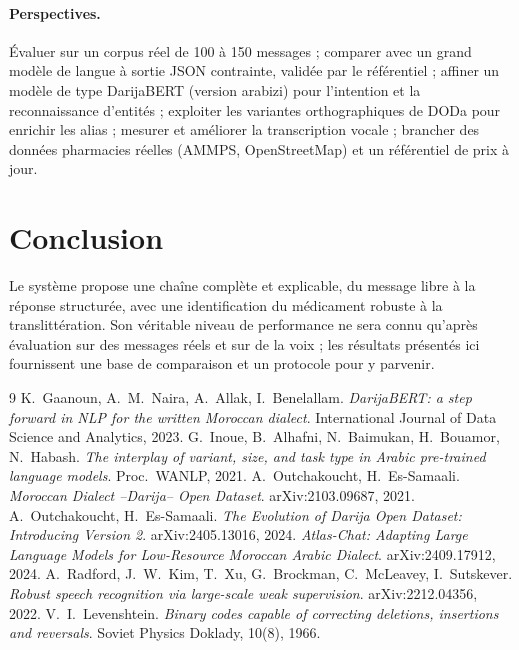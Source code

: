 \documentclass[11pt,a4paper]{article}
\begin{document}
\paragraph{Perspectives.} \'Evaluer sur un corpus r\'eel de 100 \`a 150 messages ; comparer avec un grand mod\`ele de langue \`a sortie JSON contrainte, valid\'ee par le r\'ef\'erentiel ; affiner un mod\`ele de type DarijaBERT (version arabizi) pour l'intention et la reconnaissance d'entit\'es ; exploiter les variantes orthographiques de DODa pour enrichir les alias ; mesurer et am\'eliorer la transcription vocale ; brancher des donn\'ees pharmacies r\'eelles (AMMPS, OpenStreetMap) et un r\'ef\'erentiel de prix \`a jour.

\section{Conclusion}
Le syst\`eme propose une cha\^ine compl\`ete et explicable, du message libre \`a la r\'eponse structur\'ee, avec une identification du m\'edicament robuste \`a la translitt\'eration. Son v\'eritable niveau de performance ne sera connu qu'apr\`es \'evaluation sur des messages r\'eels et sur de la voix ; les r\'esultats pr\'esent\'es ici fournissent une base de comparaison et un protocole pour y parvenir.

\begin{thebibliography}{9}\small
{} K.~Gaanoun, A.~M.~Naira, A.~Allak, I.~Benelallam. \emph{DarijaBERT: a step forward in NLP for the written Moroccan dialect}. International Journal of Data Science and Analytics, 2023.
 G.~Inoue, B.~Alhafni, N.~Baimukan, H.~Bouamor, N.~Habash. \emph{The interplay of variant, size, and task type in Arabic pre-trained language models}. Proc.\ WANLP, 2021.
 A.~Outchakoucht, H.~Es-Samaali. \emph{Moroccan Dialect --Darija-- Open Dataset}. arXiv:2103.09687, 2021.
 A.~Outchakoucht, H.~Es-Samaali. \emph{The Evolution of Darija Open Dataset: Introducing Version 2}. arXiv:2405.13016, 2024.
 \emph{Atlas-Chat: Adapting Large Language Models for Low-Resource Moroccan Arabic Dialect}. arXiv:2409.17912, 2024.
 A.~Radford, J.~W.~Kim, T.~Xu, G.~Brockman, C.~McLeavey, I.~Sutskever. \emph{Robust speech recognition via large-scale weak supervision}. arXiv:2212.04356, 2022.
 V.~I.~Levenshtein. \emph{Binary codes capable of correcting deletions, insertions and reversals}. Soviet Physics Doklady, 10(8), 1966.
\end{thebibliography}
\end{document}
